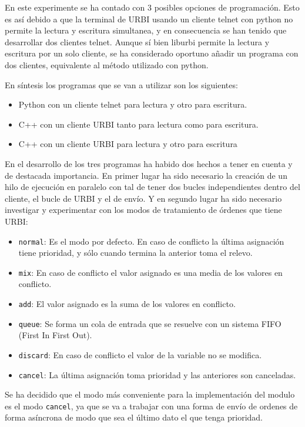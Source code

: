 \documentclass[12pt,a4paper,final,twoside]{book}
\begin{document}
En este experimente se ha contado con 3 posibles opciones de programación. Esto es así debido a que la terminal de URBI usando un cliente telnet con python no permite la lectura y escritura simultanea, y en consecuencia se han tenido que desarrollar dos clientes telnet. Aunque sí bien liburbi permite la lectura y escritura por un solo cliente, se ha considerado oportuno añadir un programa con dos clientes, equivalente al método utilizado con python.

En síntesis los programas que se van a utilizar son los siguientes:
\begin{itemize}
\item Python con un cliente telnet para lectura y otro para escritura.
\item C++ con un cliente URBI tanto para lectura como para escritura.
\item C++ con un cliente URBI para lectura y otro para escritura
\end{itemize}

En el desarrollo de los tres programas ha habido dos hechos a tener en cuenta y de destacada importancia.
En primer lugar ha sido necesario la creación de un hilo de ejecución en paralelo con tal de tener dos bucles independientes dentro del cliente, el bucle de URBI y el de envío.
Y en segundo lugar ha sido necesario investigar y experimentar con los modos de tratamiento  de órdenes que tiene URBI:
\begin{itemize}
\item \texttt{normal}: Es el modo por defecto. En caso de conflicto la última asignación tiene prioridad, y sólo cuando termina la anterior toma el relevo.
\item \texttt{mix}: En caso de conflicto el valor asignado es una media de los valores en conflicto.
\item \texttt{add}: El valor asignado es la suma de los valores en conflicto.
\item \texttt{queue}: Se forma un cola de entrada que se resuelve con un sistema FIFO (First In First Out).
\item \texttt{discard}: En caso de conflicto el valor de la variable no se modifica.
\item \texttt{cancel}: La última asignación toma prioridad y las anteriores son canceladas. 
\end{itemize}


Se ha decidido que el modo más conveniente para la implementación del modulo es el modo \texttt{cancel}, ya que se va a trabajar con una forma de envío de ordenes de forma asíncrona de modo que sea el último dato el que tenga prioridad.
\end{document}
